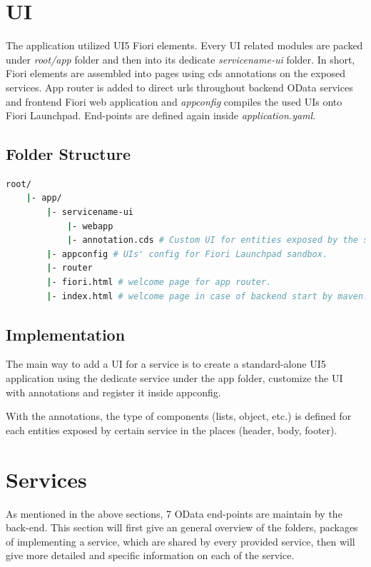\section{UI}
The application utilized UI5 Fiori elements. Every UI related modules are packed under \textit{root/app} folder and then into its dedicate \textit{servicename-ui} folder. In short, Fiori elements are assembled into pages using cds annotations on the exposed services. App router is added to direct urls throughout backend OData services and frontend Fiori web application and \textit{appconfig} compiles the used UIs onto Fiori Launchpad. End-points are defined again inside \textit{application.yaml}.

\subsection{Folder Structure}

\begin{lstlisting}[language={bash}]
root/
    |- app/
        |- servicename-ui
            |- webapp
            |- annotation.cds # Custom UI for entities exposed by the service.
        |- appconfig # UIs' config for Fiori Launchpad sandbox.
        |- router
        |- fiori.html # welcome page for app router.
        |- index.html # welcome page in case of backend start by maven.
\end{lstlisting}

\subsection{Implementation}

The main way to add a UI for a service is to create a standard-alone UI5 application using the dedicate service under the app folder, customize the UI with annotations and register it inside appconfig.

With the annotations, the type of components (lists, object, etc.) is defined for each entities exposed by certain service in the places (header, body, footer).
\section{Services}

As mentioned in the above sections, 7 OData end-points are maintain by the back-end. This section will first give an general overview of the folders, packages of implementing a service, which are shared by every provided service, then will give more detailed and specific information on each of the service.


